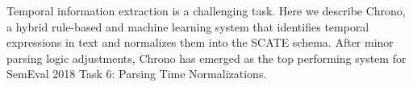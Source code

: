 Temporal information extraction is a challenging task. Here we describe Chrono, a hybrid rule-based and machine learning system that identifies temporal expressions in text and normalizes them into the SCATE schema. After minor parsing logic adjustments, Chrono has emerged as the top performing system for SemEval 2018 Task 6: Parsing Time Normalizations.
